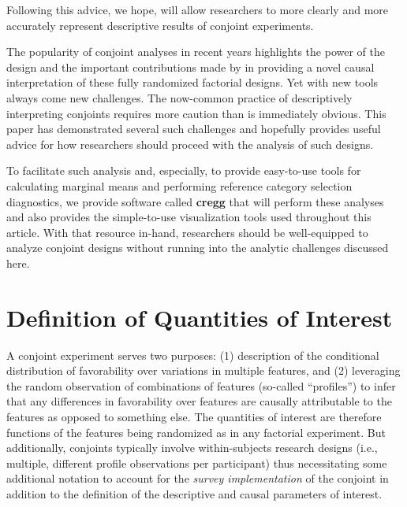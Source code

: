 \documentclass[a4paper,12pt]{article}\usepackage[]{graphicx}\usepackage[]{color}
\begin{document}
\noindent Following this advice, we hope, will allow researchers to more clearly and more accurately represent descriptive results of conjoint experiments.

The popularity of conjoint analyses in recent years highlights the power of the design and the important contributions made by \citet{HainmuellerHopkinsYamamoto2014} in providing a novel causal interpretation of these fully randomized factorial designs. Yet with new tools always come new challenges. The now-common practice of descriptively interpreting conjoints requires more caution than is immediately obvious. This paper has demonstrated several such challenges and hopefully provides useful advice for how researchers should proceed with the analysis of such designs.

To facilitate such analysis and, especially, to provide easy-to-use tools for calculating marginal means and performing reference category selection diagnostics, we provide software called \textbf{cregg} \citep{Leeper2018cregg} that will perform these analyses and also provides the simple-to-use visualization tools used throughout this article. With that resource in-hand, researchers should be well-equipped to analyze conjoint designs without running into the analytic challenges discussed here.



\singlespacing


\clearpage


\appendix
\tableofcontents



\clearpage

\section{Definition of Quantities of Interest}\label{app:quantities}

A conjoint experiment serves two purposes: (1) description of the conditional distribution of favorability over variations in multiple features, and (2) leveraging the random observation of combinations of features (so-called ``profiles'') to infer that any differences in favorability over features are causally attributable to the features as opposed to something else. The quantities of interest are therefore functions of the features being randomized as in any factorial experiment. But additionally, conjoints typically involve within-subjects research designs (i.e., multiple, different profile observations per participant) thus necessitating some additional notation to account for the \textit{survey implementation} of the conjoint in addition to the definition of the descriptive and causal parameters of interest.
\end{document}
